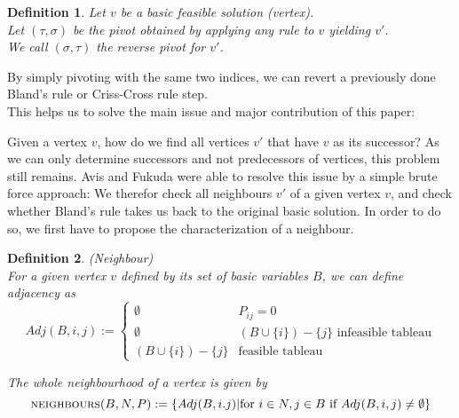 \documentclass[a4paper, 11pt]{article}
\makeatletter
\newtheorem{mydef}{Definition}
\renewenvironment{quotation}
{\list{}{\listparindent=1.5em
		\itemindent=0pt
		\parsep\z@ \@plus\p@}%
	\item\relax}
{\endlist}
\makeatother
\begin{document}
\begin{mydef}
	Let $v$ be a basic feasible solution (vertex).\\
	Let $(\tau, \sigma)$ be the pivot obtained by applying \emph{any} rule to $v$ yielding $v'$.  \\
	We call $(\sigma, \tau)$ the \textit{reverse pivot} for $v'$.
\end{mydef}

By simply pivoting with the same two indices, we can revert a previously done Bland's rule or Criss-Cross rule step. \\

This helps us to solve the main issue and major contribution of this paper:\\
\begin{quotation}
	Given a vertex $v$, how do we find all vertices $v'$ that have $v$ as its successor?
\end{quotation}
As we can only determine successors and not predecessors of vertices, this problem still remains. Avis and Fukuda were able to resolve this issue by a simple brute force approach: We therefor check all neighbours $v'$ of a given vertex $v$, and check whether Bland's rule takes us back to the original basic solution. In order to do so, we first have to propose the characterization of a neighbour.\\

\begin{mydef}(Neighbour)\\
	For a given vertex $v$ defined by its set of basic variables $B$, we can define \emph{adjacency} as\\
	\begin{equation*}
		Adj(B, i,j) := \left\{ \begin{matrix}
			\emptyset&P_{ij}=0\\
			\emptyset&(B\cup \{i\})-\{j\} \text{ infeasible tableau}\\
			
			(B\cup \{i\})-\{j\}&\text{feasible tableau}
		\end{matrix} \right.
	\end{equation*}
	
	The whole neighbourhood of a vertex is given by
	\begin{equation}
		\textsc{neighbours}(B,N,P):=\{ Adj(B,i.j) | \text{for }i\in N, j\in B\text{ if } Adj(B,i,j)\neq\emptyset \}
	\end{equation}

\end{mydef}
\end{document}
